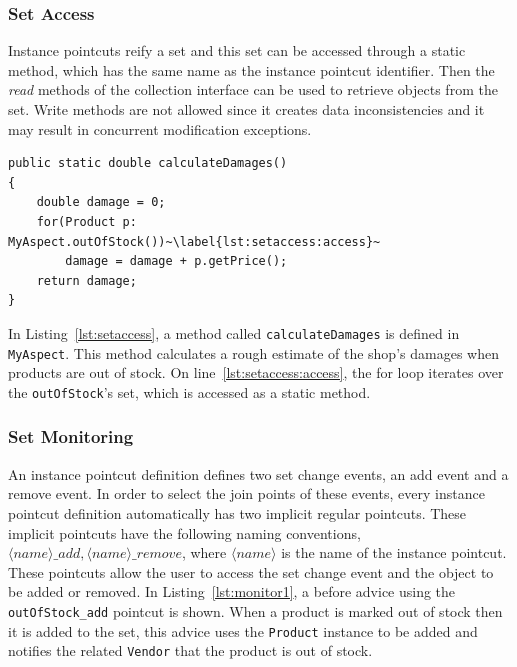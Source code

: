 \documentclass{acm_proc_article-sp}
\newcommand{\lstinln}[1]{\lstinline~#1~}
\begin{document}
\subsubsection{Set Access}
Instance pointcuts reify a set and this set can be accessed through a static method, which has the same name as the instance pointcut identifier. Then the \emph{read} methods of the collection interface can be used to retrieve objects from the set. Write methods are not allowed since it creates data inconsistencies and it may result in concurrent modification exceptions. 


\begin{lstlisting}[float=h!, caption={Calculate a damage estimate for out of stock products}, label={lst:setaccess}]
public static double calculateDamages()
{
	double damage = 0;
	for(Product p: MyAspect.outOfStock())~\label{lst:setaccess:access}~
		damage = damage + p.getPrice();
	return damage;
}
\end{lstlisting}

In Listing~\ref{lst:setaccess},  a method called \lstinln{calculateDamages} is defined in \lstinln{MyAspect}. This method calculates a rough estimate of the shop's damages when products are out of stock. On line~\ref{lst:setaccess:access}, the for loop iterates over the \lstinln{outOfStock}'s set, which is accessed as a static method.


\subsubsection{Set Monitoring}
An instance pointcut definition defines two set change events, an add event and a remove event. In order to select the join points of these events, every instance pointcut definition automatically has two implicit regular pointcuts. These implicit pointcuts have the following naming conventions, $\langle name \rangle\_add, \langle name \rangle\_remove$, where $\langle name \rangle$ is the name of the instance pointcut. These pointcuts allow the user to access the set change event and the object to be added or removed. In Listing~\ref{lst:monitor1}, a before advice using the \lstinln{outOfStock_add} pointcut is shown. When a product is marked out of stock then it is added to the set, this advice uses the \lstinln{Product} instance to be added and notifies the related \lstinln{Vendor} that the product is out of stock.
\end{document}
